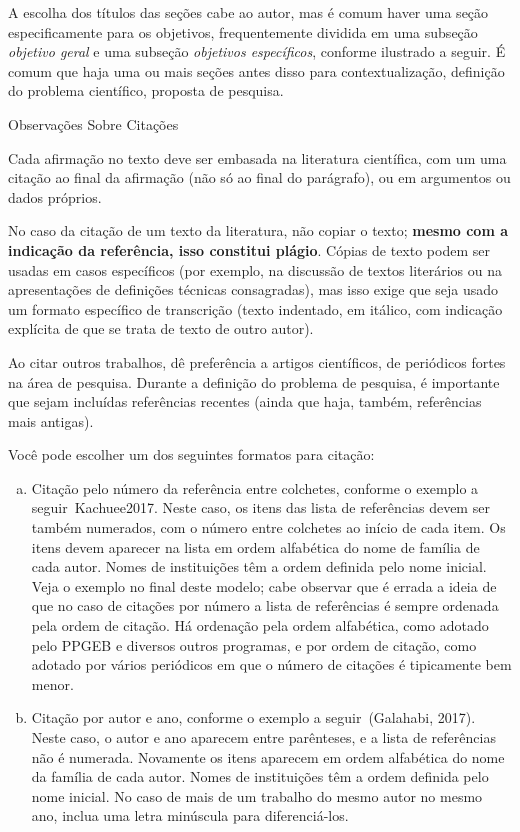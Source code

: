 \documentclass[a4paper, 12pt]{ppgeb}
\makeatletter
\renewcommand{\section}{\@startsection
{section}
{1}
{0mm}
{-\baselineskip}
{0.5\baselineskip}
{\large\bfseries\scshape}}
\makeatother
\begin{document}
A escolha dos títulos das seções cabe ao autor, mas é comum haver uma seção especificamente para os objetivos, frequentemente dividida em uma subseção \emph{objetivo geral} e uma subseção \emph{objetivos específicos}, conforme ilustrado a seguir. É comum que haja uma ou mais seções antes disso para contextualização, definição do problema científico, proposta de pesquisa.

\section{Observações Sobre Citações}

Cada afirmação no texto deve ser embasada na literatura científica, com um uma citação ao final da afirmação (não só ao final do parágrafo), ou em argumentos ou dados próprios.

No caso da citação de um texto da literatura, não copiar o texto; \textbf{mesmo com a indicação da referência, isso constitui plágio}. Cópias de texto podem ser usadas em casos específicos (por exemplo, na discussão de textos literários ou na apresentações de definições técnicas consagradas), mas isso exige que seja usado um formato específico de transcrição (texto indentado, em itálico, com indicação explícita de que se trata de texto de outro autor).

Ao citar outros trabalhos, dê preferência a artigos científicos, de periódicos fortes na área de pesquisa. Durante a definição do problema de pesquisa, é importante que sejam incluídas referências recentes (ainda que haja, também, referências mais antigas).

Você pode escolher um dos seguintes formatos para citação:
\begin{enumerate}[a)]
\item Citação pelo número da referência entre colchetes, conforme o exemplo a seguir~\cite{mainreferences}{Kachuee2017}. Neste caso, os itens das lista de referências devem ser também numerados, com o número entre colchetes ao início de cada item. Os itens devem aparecer na lista em ordem alfabética do nome de família de cada autor. Nomes de instituições têm a ordem definida pelo nome inicial. Veja o exemplo no final deste modelo; cabe observar que é errada a ideia de que no caso de citações por número a lista de referências é sempre ordenada pela ordem de citação. Há ordenação pela ordem alfabética, como adotado pelo PPGEB e diversos outros programas, e por ordem de citação, como adotado por vários periódicos em que o número de citações é tipicamente bem menor.
\item Citação por autor e ano, conforme o exemplo a seguir~(Galahabi, 2017). Neste caso, o autor e ano aparecem entre parênteses, e a lista de referências não é numerada. Novamente os itens aparecem em ordem alfabética do nome da família de cada autor. Nomes de instituições têm a ordem definida pelo nome inicial. No caso de mais de um trabalho do mesmo autor no mesmo ano, inclua uma letra minúscula para diferenciá-los.
\end{enumerate}
\end{document}
